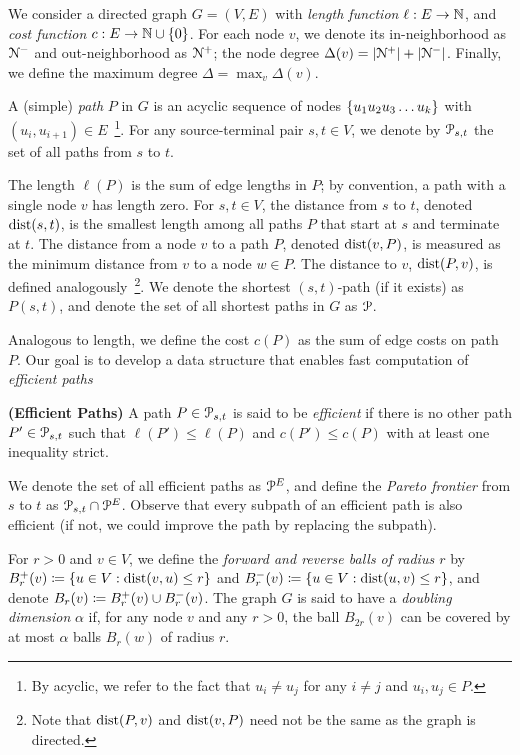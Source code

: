 
We consider a directed graph $G=(V,E)$ with \emph{length function} $\ell:E\to \N$, and \emph{cost function} $c:E\to \N\cup\{0\}$.
For each node $v$, we denote its in-neighborhood as $\Nb$ and out-neighborhood as $\Nf$; the node degree $\Delta(v) = |\Nf|+|\Nb|$.
Finally, we define the maximum degree $\Delta = \max_v\Delta(v)$.


A (simple) \emph{path} $P$ in $G$ is an acyclic sequence of nodes  $\crl*{u_1u_2u_3\ldots u_k}$ with $(u_i,u_{i+1})\in E$~\footnote{By acyclic, we refer to the fact that $u_i\neq u_j$ for any $i\neq j$ and $u_i,u_j\in P$.}. 
For any source-terminal pair $s,t\in V$, we denote by $\calP_{s,t}$ the set of all paths from $s$ to $t$.

The length $\ell(P)$ is the sum of edge lengths in $P$; by convention, a path with a single node $v$ has length zero.
For $s,t\in V$, the distance from $s$ to $t$, denoted $\dist(s,t)$, is the smallest length among all paths $P$ that start at $s$ and terminate at $t$.
The distance from a node $v$ to a path $P$, denoted $\dist(v,P)$, is measured as the minimum distance from $v$ to a node $w\in P$.
The distance to $v$, $\dist(P,v)$, is defined analogously~\footnote{Note that  $\dist(P,v)$ and  $\dist(v,P)$ need not be the same as the graph is directed.}.
We denote the shortest $(s,t)$-path (if it exists) as $P(s,t)$, and denote the set of all shortest paths in $G$ as $\calP$.



Analogous to length, we define the cost $c(P)$ as the sum of edge costs on path $P$. 
Our goal is to develop a data structure that enables fast computation of \emph{efficient paths}
\begin{definition}
\textbf{(Efficient Paths)} A path $P\in \calP_{s,t}$ is said to be \emph{efficient} if there is no other path $P'\in \calP_{s,t}$ such that $\ell(P')\leq \ell(P)$ and $c(P')\leq c(P)$ with at least one inequality strict.
\end{definition}
We denote the set of all efficient paths as $\PE$, and define the \emph{Pareto frontier} from $s$ to $t$ as $\calP_{s,t}\cap\PE$.
Observe that every subpath of an efficient path is also efficient (if not, we could improve the path by replacing the subpath).


For $r>0$ and $v\in V$, we define the \emph{forward and reverse balls of radius $r$} by $\Bf_r(v)\defeq\{u\in V: \dist(v,u)\leq r\}$ and $\Bb_r(v)\defeq\{u\in V: \dist(u,v)\leq r\}$, and denote $B_r(v)\defeq\Bf_r(v)\cup\Bb_r(v)$.
The graph $G$ is said to have a \emph{doubling dimension} $\alpha$ if, for any node $v$ and any $r>0$, the ball $B_{2r}(v)$ can be covered by at most $\alpha$ balls $B_r(w)$ of radius $r$. 


